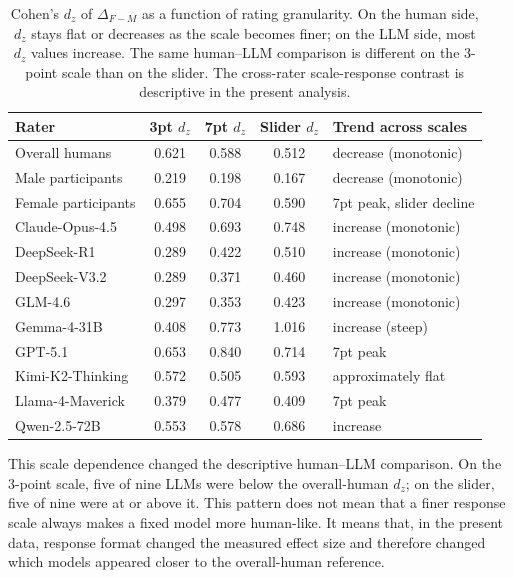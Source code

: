 \documentclass[a4paper,fleqn,review]{cas-sc}
\begin{document}
\begin{table}[t]
  \small
  \centering
  \begin{tabular}{lcccl}
    \toprule
    Rater & 3pt $d_z$ & 7pt $d_z$ & Slider $d_z$ & Trend across scales \\
    \midrule
    Overall humans      & 0.621 & 0.588 & 0.512 & decrease (monotonic) \\
    Male participants   & 0.219 & 0.198 & 0.167 & decrease (monotonic) \\
    Female participants & 0.655 & 0.704 & 0.590 & 7pt peak, slider decline \\
    \midrule
    Claude-Opus-4.5     & 0.498 & 0.693 & 0.748 & increase (monotonic) \\
    DeepSeek-R1         & 0.289 & 0.422 & 0.510 & increase (monotonic) \\
    DeepSeek-V3.2       & 0.289 & 0.371 & 0.460 & increase (monotonic) \\
    GLM-4.6             & 0.297 & 0.353 & 0.423 & increase (monotonic) \\
    Gemma-4-31B         & 0.408 & 0.773 & 1.016 & increase (steep) \\
    GPT-5.1             & 0.653 & 0.840 & 0.714 & 7pt peak \\
    Kimi-K2-Thinking    & 0.572 & 0.505 & 0.593 & approximately flat \\
    Llama-4-Maverick    & 0.379 & 0.477 & 0.409 & 7pt peak \\
    Qwen-2.5-72B        & 0.553 & 0.578 & 0.686 & increase \\
    \bottomrule
  \end{tabular}
  \caption{Cohen's $d_z$ of $\Delta_{F-M}$ as a function of rating granularity. On the human side, $d_z$ stays flat or decreases as the scale becomes finer; on the LLM side, most $d_z$ values increase. The same human--LLM comparison is different on the 3-point scale than on the slider. The cross-rater scale-response contrast is descriptive in the present analysis.}
  \label{tab:scale-response}
\end{table}

This scale dependence changed the descriptive human--LLM comparison. On the 3-point scale, five of nine LLMs were below the overall-human $d_z$; on the slider, five of nine were at or above it. This pattern does not mean that a finer response scale always makes a fixed model more human-like. It means that, in the present data, response format changed the measured effect size and therefore changed which models appeared closer to the overall-human reference.
\end{document}

